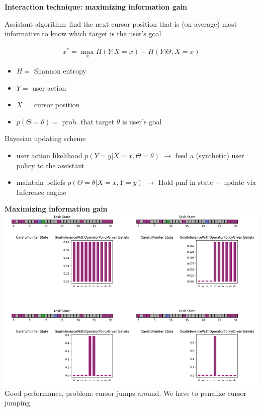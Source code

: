 \documentclass[11pt, xcolor = {dvipsnames}]{beamer}
\begin{document}
\begin{frame}{\textbf{Interaction technique: maximizing information gain}}

Assistant algorithm: find the next cursor position that is (on average) most informative to know which target is the user's goal

\begin{align*}
x^* = \max_x H(Y|X=x) - H(Y|\Theta, X=x)
\end{align*}

\begin{itemize}
\item $H = $ Shannon entropy
\item $Y = $ user action 
\item $X = $ cursor position
\item $p(\Theta = \theta)=$ prob. that target $\theta$ is user's goal
\end{itemize}
Bayesian updating scheme
\begin{itemize}
\item user action likelihood $p(Y=y | X=x, \Theta = \theta)$ $\longrightarrow$ feed a (synthetic) user policy to the assistant
\item maintain beliefs $p(\Theta = \theta | X=x, Y=y)$ $\longrightarrow$ Hold pmf in state + update via Inference engine
\end{itemize}

\end{frame}

\begin{frame}{\textbf{Maximizing information gain}}
\centering
\includegraphics[width=\textwidth, height = .7\textheight, keepaspectratio]{fig/biggain.png} \\

Good performance, problem: cursor jumps around. We have to penalize cursor jumping.
\end{frame}
\end{document}
